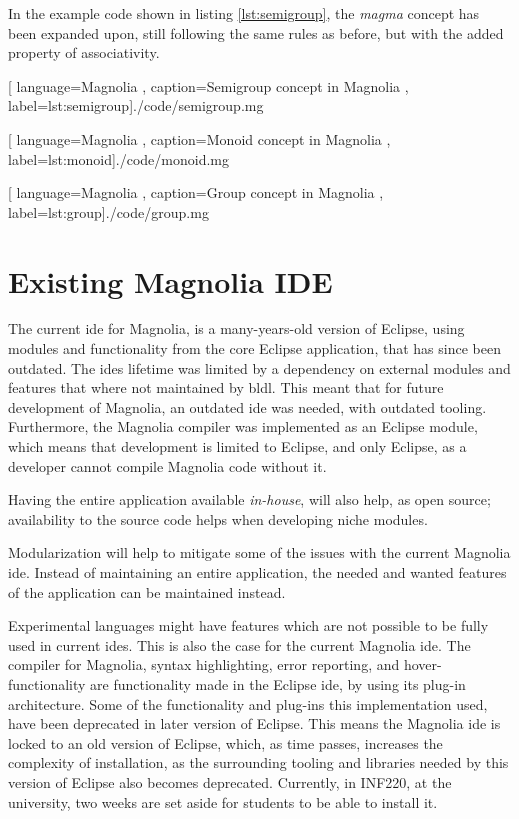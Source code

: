 In the example code shown in listing \ref{lst:semigroup}, the \textit{magma}
concept has been expanded upon, still following the same rules as before, but
with the added property of associativity.

\begin{center}
  
    [ language=Magnolia
    , caption={Semigroup concept in Magnolia}
    , label=lst:semigroup]{./code/semigroup.mg}
\end{center}

\begin{center}
  
    [ language=Magnolia
    , caption={Monoid concept in Magnolia}
    , label=lst:monoid]{./code/monoid.mg}
\end{center}

\begin{center}
  
    [ language=Magnolia
    , caption={Group concept in Magnolia}
    , label=lst:group]{./code/group.mg}
\end{center}

\section{Existing Magnolia IDE}

The current \gls{ide} for Magnolia, is a many-years-old version of Eclipse,
using modules and functionality from the core Eclipse application, that has
since been outdated. The \gls{ide}s lifetime was limited by a dependency on
external modules and features that where not maintained by \gls{bldl}. This
meant that for future development of Magnolia, an outdated \gls{ide} was needed,
with outdated tooling. Furthermore, the Magnolia compiler was implemented as an
Eclipse module, which means that development is limited to Eclipse, and only
Eclipse, as a developer cannot compile Magnolia code without it.

Having the entire application available \textit{in-house}, will also help, as
open source; availability to the source code helps when developing niche
modules.

Modularization will help to mitigate some of the issues with the current
Magnolia \gls{ide}. Instead of maintaining an entire application, the needed and
wanted features of the application can be maintained instead.

Experimental languages might have features which are not possible to be fully
used in current \gls{ide}s. This is also the case for the current Magnolia
\gls{ide}. The compiler for Magnolia, syntax highlighting, error reporting, and
hover-functionality are functionality made in the Eclipse \gls{ide}, by using
its plug-in architecture. Some of the functionality and plug-ins this
implementation used, have been deprecated in later version of Eclipse. This
means the Magnolia \gls{ide} is locked to an old version of Eclipse, which, as
time passes, increases the complexity of installation, as the surrounding
tooling and libraries needed by this version of Eclipse also becomes deprecated.
Currently, in INF220, at the university, two weeks are set aside for students to
be able to install it.

